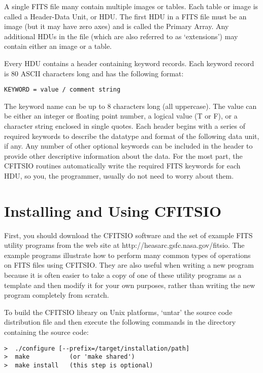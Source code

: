 \documentclass[11pt]{article}
\begin{document}
A single FITS file many contain multiple images or tables.  Each table
or image is called a Header-Data Unit, or HDU.  The first HDU in a FITS
file must be an image (but it may have zero axes) and is called the
Primary Array.  Any additional HDUs in the file (which are also
referred to as `extensions') may contain either an image or a table.

Every HDU contains a header containing keyword records.  Each keyword
record is 80 ASCII characters long and has the following format:

\begin{verbatim}
KEYWORD = value / comment string
\end{verbatim}

The keyword name can be up to 8 characters long (all uppercase).  The
value can be either an integer or floating point number, a logical
value (T or F), or a character string enclosed in single quotes.  Each
header begins with a series of required keywords to describe the
datatype and format of the following data unit, if any.  Any number of
other optional keywords can be included in  the header to provide other
descriptive information about the data.  For the most part, the CFITSIO
routines automatically write the required FITS keywords for each HDU,
so you, the programmer, usually do not need to worry about them.

\section{Installing and Using CFITSIO}

First, you should download the CFITSIO software and the set of example
FITS utility programs from the web site at
http://heasarc.gsfc.nasa.gov/fitsio.  The example programs illustrate
how to perform many common types of operations on FITS files using
CFITSIO.  They are also useful when writing a new program because it is
often easier to take a copy of one of these utility programs as a
template and then modify it for your own purposes, rather than writing
the new program completely from scratch.

To build the CFITSIO library on Unix platforms, `untar' the source code
distribution file and then execute the following commands in the
directory containing the source code:

\begin{verbatim}
>  ./configure [--prefix=/target/installation/path]
>  make           (or 'make shared')
>  make install   (this step is optional)
\end{verbatim}
\end{document}
